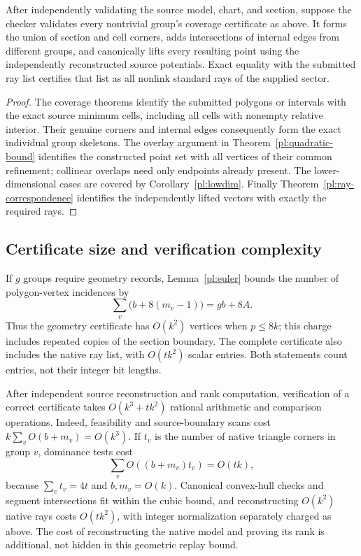 \begin{theorem}
\label{cv:complete-replay}
After independently validating the source model, chart, and section,
suppose the checker validates every nontrivial group's coverage
certificate as above.  It forms the union of section and cell
corners, adds intersections of internal edges from different
groups, and canonically lifts every resulting point using the
independently reconstructed source potentials.
Exact equality with the submitted ray list certifies that list as
all nonlink standard rays of the supplied sector.
\end{theorem}
\begin{proof}
The coverage theorems identify the submitted polygons or intervals
with the exact source minimum cells, including all cells with
nonempty relative interior.  Their genuine corners and internal
edges consequently form the exact individual group skeletons.
The overlay argument in Theorem~\ref{pl:quadratic-bound} identifies
the constructed point set with all vertices of their common
refinement; collinear overlaps need only endpoints already present.
The lower-dimensional cases are covered by
Corollary~\ref{pl:lowdim}.
Finally Theorem~\ref{pl:ray-correspondence} identifies the
independently lifted vectors with exactly the required rays.
\end{proof}

\subsection{Certificate size and verification complexity}
\label{cv:cost}

If \(g\) groups require geometry records, Lemma~\ref{pl:euler}
bounds the number of polygon-vertex incidences by
\[
 \sum_v\bigl(b+8(m_v-1)\bigr)=gb+8A.
\]
Thus the geometry certificate has \(O(k^2)\) vertices when
\(p\leq8k\); this charge includes repeated copies of the section
boundary.  The complete certificate also includes the native
ray list, with \(O(tk^2)\) scalar entries.
Both statements count entries, not their integer bit lengths.

After independent source reconstruction and rank computation,
verification of a correct certificate takes \(O(k^3+tk^2)\)
rational arithmetic and comparison operations.
Indeed, feasibility and source-boundary scans cost
\(k\sum_vO(b+m_v)=O(k^3)\).
If \(t_v\) is the number of native triangle corners in group \(v\),
dominance tests cost
\[
 \sum_v O((b+m_v)t_v)=O(tk),
\]
because \(\sum_vt_v=4t\) and \(b,m_v=O(k)\).
Canonical convex-hull checks and segment intersections fit within
the cubic bound, and reconstructing \(O(k^2)\) native rays costs
\(O(tk^2)\), with integer normalization separately charged as
above.  The cost of reconstructing the native model and proving
its rank is additional, not hidden in this geometric replay bound.

